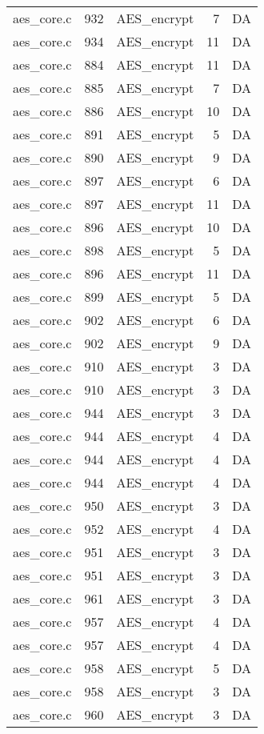 \begin{table}
\begin{tabular}{lrlrr}
aes\_core.c& 932&AES\_encrypt&7 &DA\\
aes\_core.c& 934&AES\_encrypt&11&DA\\
aes\_core.c& 884&AES\_encrypt&11&DA\\
aes\_core.c& 885&AES\_encrypt&7 &DA\\
aes\_core.c& 886&AES\_encrypt&10&DA\\
aes\_core.c& 891&AES\_encrypt&5 &DA\\
aes\_core.c& 890&AES\_encrypt&9 &DA\\
aes\_core.c& 897&AES\_encrypt&6 &DA\\
aes\_core.c& 897&AES\_encrypt&11&DA\\
aes\_core.c& 896&AES\_encrypt&10&DA\\
aes\_core.c& 898&AES\_encrypt&5 &DA\\
aes\_core.c& 896&AES\_encrypt&11&DA\\
aes\_core.c& 899&AES\_encrypt&5 &DA\\
aes\_core.c& 902&AES\_encrypt&6 &DA\\
aes\_core.c& 902&AES\_encrypt&9 &DA\\
aes\_core.c& 910&AES\_encrypt&3 &DA\\
aes\_core.c& 910&AES\_encrypt&3 &DA\\
aes\_core.c& 944&AES\_encrypt&3 &DA\\
aes\_core.c& 944&AES\_encrypt&4 &DA\\
aes\_core.c& 944&AES\_encrypt&4 &DA\\
aes\_core.c& 944&AES\_encrypt&4 &DA\\
aes\_core.c& 950&AES\_encrypt&3 &DA\\
aes\_core.c& 952&AES\_encrypt&4 &DA\\
aes\_core.c& 951&AES\_encrypt&3 &DA\\
aes\_core.c& 951&AES\_encrypt&3 &DA\\
aes\_core.c& 961&AES\_encrypt&3 &DA\\
aes\_core.c& 957&AES\_encrypt&4 &DA\\
aes\_core.c& 957&AES\_encrypt&4 &DA\\
aes\_core.c& 958&AES\_encrypt&5 &DA\\
aes\_core.c& 958&AES\_encrypt&3 &DA\\
aes\_core.c& 960&AES\_encrypt&3 &DA\\
\hline
\end{tabular}
\renewcommand{\baselinestretch}{1.0}\selectfont
\end{table}

